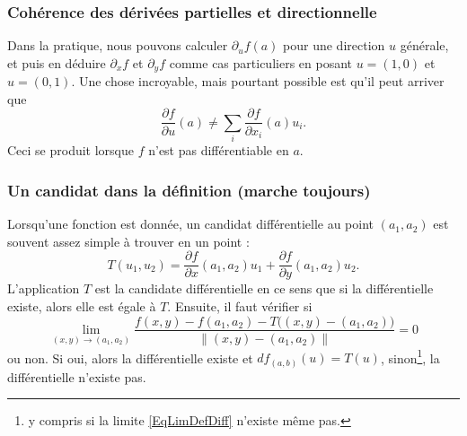 \subsubsection{Cohérence des dérivées partielles et directionnelle}

Dans la pratique, nous pouvons calculer \( \partial_uf(a)\) pour une direction \( u\) générale, et puis en déduire \( \partial_xf\) et \( \partial_yf\) comme cas particuliers en posant \( u=(1,0)\) et \( u=(0,1)\). Une chose incroyable, mais pourtant possible est qu'il peut arriver que
\begin{equation}
	\frac{ \partial f }{ \partial u }(a)\neq \sum_i\frac{ \partial f }{ \partial x_i }(a)u_i.
\end{equation}
Ceci se produit lorsque \( f\) n'est pas différentiable en \( a\). 

\subsubsection{Un candidat dans la définition (marche toujours)}

Lorsqu'une fonction est donnée, un candidat différentielle au point \( (a_1,a_2)\) est souvent assez simple à trouver en un point :
\begin{equation}
	T(u_1,u_2)=\frac{ \partial f }{ \partial x }(a_1,a_2)u_1+\frac{ \partial f }{ \partial y }(a_1,a_2)u_2.
\end{equation}
L'application \( T\) est la candidate différentielle en ce sens que si la différentielle existe, alors elle est égale à \( T\). Ensuite, il faut vérifier si
\begin{equation}        \label{EqLimDefDiff}
	\lim_{(x,y)\to (a_1,a_2)} \frac{f(x,y) - f(a_1,a_2) - T\big( (x,y)-(a_1,a_2) \big)}{\| (x,y)-(a_1,a_2) \|}=0
\end{equation}
ou non. Si oui, alors la différentielle existe et \( df_{(a,b)}(u)=T(u)\), sinon\footnote{y compris si la limite \eqref{EqLimDefDiff} n'existe même pas.}, la différentielle n'existe pas.

